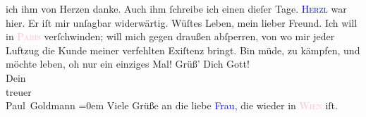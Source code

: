                ich ihm von Herzen danke. Auch ihm ſchreibe ich einen dieſer Tage.\pend
           \pstart
           \textsc{\textcolor{blue}{Herzl}{}\ledrightnote{\textcolor{blue}{Theodor Herzl}}} war hier. Er iſt mir unſagbar widerwärtig.\pend
           \pstart
           Wüſtes Leben, mein lieber Freund. Ich will in \textsc{\textcolor{pink}{Paris}{}\ledrightnote{\textcolor{pink}{Paris}}} verſchwinden; will mich gegen draußen abſperren, von wo mir jeder Luftzug die
               Kunde meiner {\pb}verfehlten Exiſtenz bringt. Bin müde,
               zu kämpfen, und möchte leben, oh nur ein einziges Mal!\pend
           \pstart
           Grüß’ Dich Gott! {\\[\baselineskip]}Dein {\\[\baselineskip]}treuer {\\[\baselineskip]}\spacefill\mbox{Paul Goldmann}\pend
           \leftskip=0em{}\pstart
           \noindent{}Viele Grüße an die liebe \textcolor{blue}{Frau}{}, die wieder in \textsc{\textcolor{pink}{Wien}{}\ledrightnote{\textcolor{pink}{Wien}}} iſt.\pend
           \endnumbering{}\begin{anhang}\end{anhang}
      